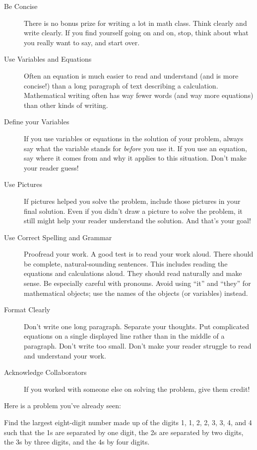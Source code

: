 \begin{description}
\item[Be Concise] There is no bonus prize for writing a lot in math class.  Think clearly and write clearly.  If you find yourself going on and on, stop, think about what you really want to say, and start over.


\item[Use Variables and Equations] Often an equation is much easier to read and understand (and is more concise!) than a long paragraph of text describing a calculation.  Mathematical writing often has way fewer words (and way more equations) than other kinds of writing.

\item[Define your Variables] If you use variables or equations in the solution of your problem, always say what the variable stands for \emph{before} you use it.  If you use an equation, say where it comes from and why it applies to this situation.  Don't make your reader guess!

\item[Use Pictures] If pictures helped you solve the problem, include those pictures in your final solution.  Even if you didn't draw a picture to solve the problem, it still might help your reader understand the solution.  And that's your goal!

\item[Use Correct Spelling and Grammar] Proofread your work.  A good test is to read your work aloud.  There should be complete, natural-sounding sentences.  This includes reading the equations and calculations aloud.  They should read naturally and make sense.   Be especially careful with pronouns.  Avoid using ``it'' and ``they'' for mathematical objects; use the names of the objects (or variables) instead.

\item[Format Clearly] Don't write one long paragraph.  Separate your thoughts.   Put complicated equations on a single displayed line rather than in the middle of a paragraph.  Don't write too small.  Don't make your reader struggle to read and understand your work.

\item[Acknowledge Collaborators] If you worked with someone else on solving the problem, give them credit!


\end{description}

Here is a problem you've already seen:
\begin{problem*}
Find the largest eight-digit number made up of the digits 1, 1, 2, 2, 3, 3, 4, and 4 such that the 1s are separated by one digit, the 2s are separated by two digits, the 3s by three digits, and the 4s by four digits.

\end{problem*}

